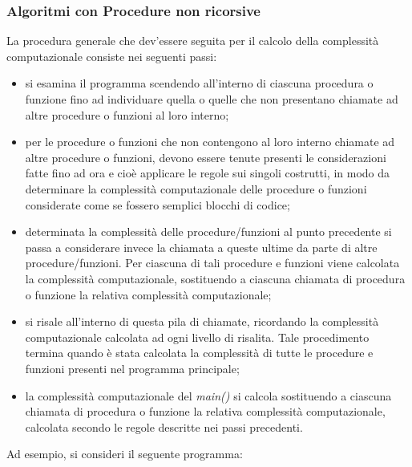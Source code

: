 \subsubsection{Algoritmi con Procedure non ricorsive} 

La procedura generale che dev'essere seguita per il calcolo della complessità computazionale consiste nei seguenti passi:
\begin{itemize}
	\item si esamina il programma scendendo all'interno di ciascuna procedura o funzione fino ad individuare quella o quelle che non presentano chiamate ad altre procedure o funzioni al loro interno;
	
	\item per le procedure o funzioni che non contengono al loro interno chiamate ad altre procedure o funzioni, devono essere tenute presenti le considerazioni fatte fino ad ora e cioè applicare le regole sui singoli costrutti, in modo da determinare la complessità computazionale delle procedure o funzioni considerate come se fossero semplici blocchi di codice;
	
	\item determinata la complessità delle procedure/funzioni al punto precedente si passa a considerare invece la chiamata a queste ultime da parte di altre procedure/funzioni. Per ciascuna di tali procedure e funzioni viene calcolata la complessità computazionale, sostituendo a ciascuna chiamata di procedura o funzione la relativa complessità computazionale;
	
	\item si risale all'interno di questa pila di chiamate, ricordando la complessità computazionale calcolata ad ogni livello di risalita. Tale procedimento termina quando è stata calcolata la complessità di tutte le procedure e funzioni presenti nel programma principale;
	
	\item la complessità computazionale del \textit{main()} si calcola sostituendo a ciascuna chiamata di procedura o funzione la relativa complessità computazionale, calcolata secondo le regole descritte nei passi precedenti.
	
\end{itemize}


Ad esempio, si consideri il seguente programma:


